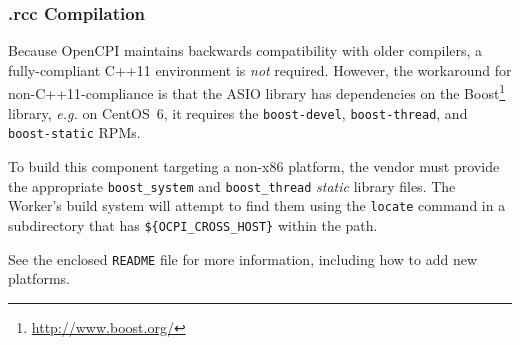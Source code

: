 \subsubsection*{\comp.rcc Compilation}
Because OpenCPI maintains backwards compatibility with older compilers, a fully-compliant C++11 environment is \textit{not} required. However, the workaround for non-C++11-compliance is that the ASIO library has dependencies on the Boost\footnote{\url{http://www.boost.org/}} library, \textit{e.g.} on CentOS~6, it requires the \verb+boost-devel+, \verb|boost-thread|, and \verb|boost-static| RPMs.\medskip

To build this component targeting a non-x86 platform, the vendor must provide the appropriate \verb+boost_system+ and \verb+boost_thread+ \textit{static} library files. The Worker's build system will attempt to find them using the \verb+locate+ command in a subdirectory that has \verb+${OCPI_CROSS_HOST}+ within the path.\medskip

See the enclosed \verb+README+ file for more information, including how to add new platforms.

